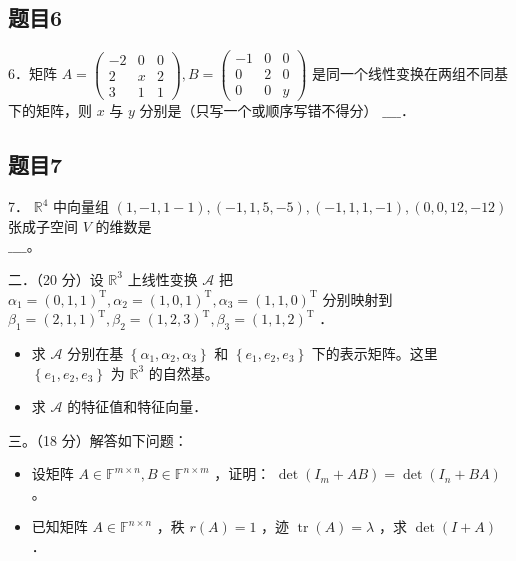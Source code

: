 \documentclass{article}
\begin{document}
\subsection{题目6}
6．矩阵 \(A=\left(\begin{array}{ccc}-2 & 0 & 0 \\ 2 & x & 2 \\ 3 & 1 & 1\end{array}\right), B=\left(\begin{array}{ccc}-1 & 0 & 0 \\ 0 & 2 & 0 \\ 0 & 0 & y\end{array}\right)\) 是同一个线性变换在两组不同基下的矩阵，则 \(x\) 与 \(y\) 分别是（只写一个或顺序写错不得分） \(\_\_\_\_\)．

\subsection{题目7}
7． \(\mathbb{R}^{4}\) 中向量组 \((1,-1,1-1),(-1,1,5,-5),(-1,1,1,-1),(0,0,12,-12)\) 张成子空间 \(V\) 的维数是\\
\(\_\_\_\_\)。

二．（20 分）设 \(\mathbb{R}^{3}\) 上线性变换 \(\mathcal{A}\) 把 \(\alpha_{1}=(0,1,1)^{\mathrm{T}}, \alpha_{2}=(1,0,1)^{\mathrm{T}}, \alpha_{3}=(1,1,0)^{\mathrm{T}}\) 分别映射到 \(\beta_{1}=(2,1,1)^{\mathrm{T}}, \beta_{2}=(1,2,3)^{\mathrm{T}}, \beta_{3}=(1,1,2)^{\mathrm{T}}\) ．

\begin{itemize}
  \item[（1）] 求 \(\mathcal{A}\) 分别在基 \(\left\{\alpha_{1}, \alpha_{2}, \alpha_{3}\right\}\) 和 \(\left\{e_{1}, e_{2}, e_{3}\right\}\) 下的表示矩阵。这里 \(\left\{e_{1}, e_{2}, e_{3}\right\}\) 为 \(\mathbb{R}^{3}\) 的自然基。
  \item[（2）] 求 \(\mathcal{A}\) 的特征值和特征向量．
\end{itemize}

三。（18 分）解答如下问题：

\begin{itemize}
  \item[（1）] 设矩阵 \(A \in \mathbb{F}^{m \times n}, B \in \mathbb{F}^{n \times m}\) ，证明： \(\operatorname{det}\left(I_{m}+A B\right)=\operatorname{det}\left(I_{n}+B A\right)\) 。
  \item[（2）] 已知矩阵 \(A \in \mathbb{F}^{n \times n}\) ，秩 \(r(A)=1\) ，迹 \(\operatorname{tr}(A)=\lambda\) ，求 \(\operatorname{det}(I+A)\) ．
\end{itemize}
\end{document}
